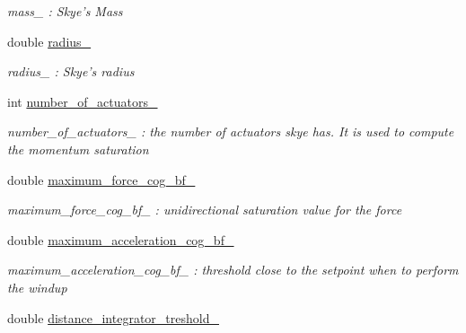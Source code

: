\begin{DoxyCompactItemize}
\begin{DoxyCompactList}\small\item\em mass\-\_\- \-: Skye's Mass \end{DoxyCompactList}\item 
\hypertarget{class_skye_geometric_controller_a4e005727f2603f4dc2ff5c8dcdd3d22b}{double \hyperlink{class_skye_geometric_controller_a4e005727f2603f4dc2ff5c8dcdd3d22b}{radius\-\_\-}}\label{class_skye_geometric_controller_a4e005727f2603f4dc2ff5c8dcdd3d22b}

\begin{DoxyCompactList}\small\item\em radius\-\_\- \-: Skye's radius \end{DoxyCompactList}\item 
\hypertarget{class_skye_geometric_controller_aef174ecff7363b397b961b2663efe4b6}{int \hyperlink{class_skye_geometric_controller_aef174ecff7363b397b961b2663efe4b6}{number\-\_\-of\-\_\-actuators\-\_\-}}\label{class_skye_geometric_controller_aef174ecff7363b397b961b2663efe4b6}

\begin{DoxyCompactList}\small\item\em number\-\_\-of\-\_\-actuators\-\_\- \-: the number of actuators skye has. It is used to compute the momentum saturation \end{DoxyCompactList}\item 
\hypertarget{class_skye_geometric_controller_a20b4551b3e19acd625f490602afc0e28}{double \hyperlink{class_skye_geometric_controller_a20b4551b3e19acd625f490602afc0e28}{maximum\-\_\-force\-\_\-cog\-\_\-bf\-\_\-}}\label{class_skye_geometric_controller_a20b4551b3e19acd625f490602afc0e28}

\begin{DoxyCompactList}\small\item\em maximum\-\_\-force\-\_\-cog\-\_\-bf\-\_\- \-: unidirectional saturation value for the force \end{DoxyCompactList}\item 
\hypertarget{class_skye_geometric_controller_a39fcc2bc245a64623e72314b61fcae96}{double \hyperlink{class_skye_geometric_controller_a39fcc2bc245a64623e72314b61fcae96}{maximum\-\_\-acceleration\-\_\-cog\-\_\-bf\-\_\-}}\label{class_skye_geometric_controller_a39fcc2bc245a64623e72314b61fcae96}

\begin{DoxyCompactList}\small\item\em maximum\-\_\-acceleration\-\_\-cog\-\_\-bf\-\_\- \-: threshold close to the setpoint when to perform the windup \end{DoxyCompactList}\item 
\hypertarget{class_skye_geometric_controller_a616c2c91d56897116b1b424df07b836b}{double \hyperlink{class_skye_geometric_controller_a616c2c91d56897116b1b424df07b836b}{distance\-\_\-integrator\-\_\-treshold\-\_\-}}\label{class_skye_geometric_controller_a616c2c91d56897116b1b424df07b836b}


\end{DoxyCompactItemize}
